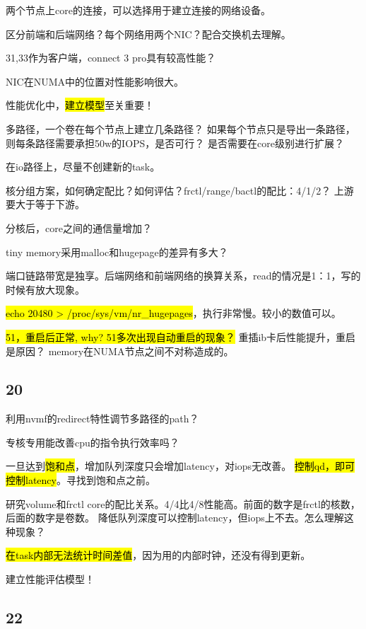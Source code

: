 两个节点上core的连接，可以选择用于建立连接的网络设备。

区分前端和后端网络？每个网络用两个NIC？配合交换机去理解。

31,33作为客户端，connect 3 pro具有较高性能？

NIC在NUMA中的位置对性能影响很大。

\hrulefill

性能优化中，\hl{建立模型}至关重要！

多路径，一个卷在每个节点上建立几条路径？
如果每个节点只是导出一条路径，则每条路径需要承担50w的IOPS，是否可行？
是否需要在core级别进行扩展？

在io路径上，尽量不创建新的task。

核分组方案，如何确定配比？如何评估？frctl/range/bactl的配比：4/1/2？
上游要大于等于下游。

分核后，core之间的通信量增加？

tiny memory采用malloc和hugepage的差异有多大？

\hrulefill

端口链路带宽是独享。后端网络和前端网络的换算关系，read的情况是1：1，写的时候有放大现象。

\hl{echo 20480 > /proc/sys/vm/nr\_hugepages}，执行非常慢。较小的数值可以。

\hl{51，重启后正常, why? 51多次出现自动重启的现象？} 重插ib卡后性能提升，重启是原因？
memory在NUMA节点之间不对称造成的。

\subsection{20}

利用nvmf的redirect特性调节多路径的path？

专核专用能改善cpu的指令执行效率吗？

一旦达到\hl{饱和点}，增加队列深度只会增加latency，对iops无改善。
\hl{控制qd，即可控制latency}。寻找到饱和点之前。

研究volume和frctl core的配比关系。4/4比4/8性能高。前面的数字是frctl的核数，后面的数字是卷数。
降低队列深度可以控制latency，但iops上不去。怎么理解这种现象？

\hl{在task内部无法统计时间差值}，因为用的内部时钟，还没有得到更新。

建立性能评估模型！

\subsection{22}

